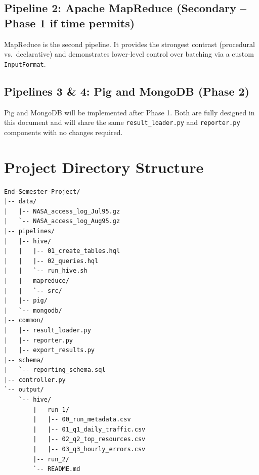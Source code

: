 \documentclass[12pt,a4paper]{article}
\begin{document}
\subsection{Pipeline 2: Apache MapReduce (Secondary -- Phase 1 if time permits)}
MapReduce is the second pipeline. It provides the strongest contrast (procedural vs.\ declarative) and demonstrates lower-level control over batching via a custom \texttt{InputFormat}.

\subsection{Pipelines 3 \& 4: Pig and MongoDB (Phase 2)}
Pig and MongoDB will be implemented after Phase 1. Both are fully designed in this document and will share the same \texttt{result\_loader.py} and \texttt{reporter.py} components with no changes required.

\section{Project Directory Structure}
\begin{verbatim}
End-Semester-Project/
|-- data/
|   |-- NASA_access_log_Jul95.gz
|   `-- NASA_access_log_Aug95.gz
|-- pipelines/
|   |-- hive/
|   |   |-- 01_create_tables.hql
|   |   |-- 02_queries.hql
|   |   `-- run_hive.sh
|   |-- mapreduce/
|   |   `-- src/
|   |-- pig/
|   `-- mongodb/
|-- common/
|   |-- result_loader.py
|   |-- reporter.py
|   |-- export_results.py
|-- schema/
|   `-- reporting_schema.sql
|-- controller.py
`-- output/
    `-- hive/
        |-- run_1/
        |   |-- 00_run_metadata.csv
        |   |-- 01_q1_daily_traffic.csv
        |   |-- 02_q2_top_resources.csv
        |   |-- 03_q3_hourly_errors.csv
        |-- run_2/
        `-- README.md
\end{verbatim}
\end{document}
